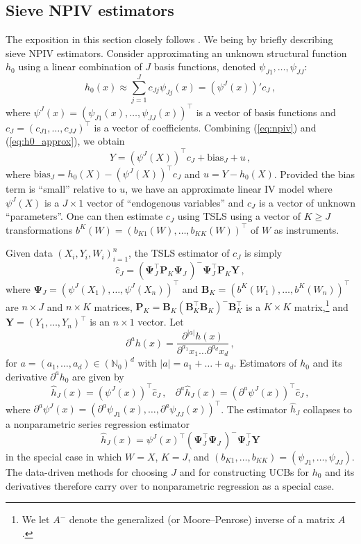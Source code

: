 \documentclass[
]{jss}
\begin{document}
\subsection{Sieve NPIV estimators}\label{sieve-npiv-estimators}

The exposition in this section closely follows \citet{CCK}. We being by
briefly describing sieve NPIV estimators. Consider approximating an
unknown structural function \(h_0\) using a linear combination of \(J\)
basis functions, denoted \(\psi_{J1},\ldots,\psi_{JJ}\):
\begin{equation}\label{eq:h0_approx}
 h_0(x) \approx \sum_{j=1}^J c_{Jj} \psi_{Jj}(x) = (\psi^J(x))'c_J\,,
\end{equation} where
\(\psi^J(x) = (\psi_{J1}(x),\ldots,\psi_{JJ}(x))^\top\) is a vector of
basis functions and \(c_J = (c_{J1},\ldots,c_{JJ})^\top\) is a vector of
coefficients. Combining (\ref{eq:npiv}) and (\ref{eq:h0_approx}), we
obtain \[
 Y = (\psi^J(X))^\top c_J + \mathrm{bias}_J + u\,,
\] where \(\mathrm{bias}_J = h_0(X) - (\psi^J(X))^\top c_J\) and
\(u = Y - h_0(X)\). Provided the bias term is ``small'' relative to
\(u\), we have an approximate linear IV model where \(\psi^J(X)\) is a
\(J\times 1\) vector of ``endogenous variables'' and \(c_J\) is a vector
of unknown ``parameters''. One can then estimate \(c_J\) using TSLS
using a vector of \(K \geq J\) transformations
\(b^K(W)= (b_{K1}(W),\ldots,b_{KK}(W))^\top\) of \(W\) as instruments.

Given data \((X_i,Y_i,W_i)_{i=1}^n\), the TSLS estimator of \(c_J\) is
simply \[
 \hat c_J = \left(\mathbf \Psi_J^\top \mathbf P_K^{\phantom \top} \mathbf \Psi_J^{\phantom \top} \right)^{-} \mathbf \Psi_J^\top \mathbf P_K^{\phantom \top} \mathbf Y \,,
\] where \(\mathbf \Psi_J  = (\psi^J({X_1}),\ldots,\psi^J({X_n}))^\top\)
and \(\mathbf B_K  = (b^K({W_1}),\ldots,b^K({W_n}))^\top\) are
\(n \times J\) and \(n \times K\) matrices,
\(\mathbf P_K = \mathbf B_K^{\phantom \prime} (\mathbf B_K^\top \mathbf B_K^{\phantom \top})^{-} \mathbf B_K^\top\)
is a \(K \times K\) matrix,\footnote{We let \(A^-\) denote the
  generalized (or Moore--Penrose) inverse of a matrix \(A\).} and
\(\mathbf Y = (Y_1,\ldots,Y_n)^\top\) is an \(n \times 1\) vector. Let
\[
 \partial^a h(x) = \frac{\partial^{|a|} h(x)}{\partial^{a_1} x_1 \ldots \partial^{a_d} x_d} \,,
\] for \(a = (a_1,\ldots,a_d) \in (\mathbb{N}_0)^d\) with
\(|a| = a_1 + \ldots + a_d\). Estimators of \(h_0\) and its derivative
\(\partial^a h_0\) are given by \[
 \hat h_J(x) = (\psi^J(x))^\top \hat c_J \,,~~~~\partial^a \hat h_J(x) =(\partial^a \psi^J(x))^\top \hat c_J \,,
\] where
\(\partial^a \psi^J(x) = (\partial^a \psi_{J1}(x),\ldots,\partial^a \psi_{JJ}(x))^\top\).
The estimator \(\hat h_J\) collapses to a nonparametric series
regression estimator \[
 \hat h_J(x) = \psi^J(x)^\top(\mathbf \Psi_J^\top\mathbf \Psi_J^{\phantom \top})^- \mathbf \Psi_J^\top \mathbf Y
\] in the special case in which \(W = X\), \(K = J\), and
\((b_{K1},\ldots,b_{KK}) = (\psi_{J1},\ldots,\psi_{JJ})\). The
data-driven methods for choosing \(J\) and for constructing UCBs for
\(h_0\) and its derivatives therefore carry over to nonparametric
regression as a special case.
\end{document}
